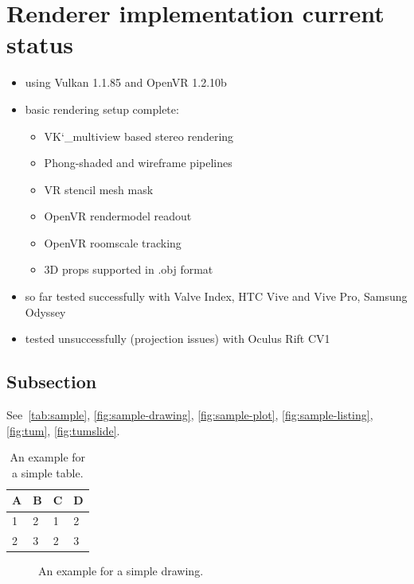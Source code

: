 \section{Renderer implementation current status}
\begin{itemize}
\item using Vulkan 1.1.85 and OpenVR 1.2.10b 
\item basic rendering setup complete: 
\begin{itemize}
\item VK\char`_multiview based stereo rendering 
\item Phong-shaded and wireframe pipelines 
\item VR stencil mesh mask 
\item OpenVR rendermodel readout 
\item OpenVR roomscale tracking 
\item 3D props supported in .obj format 
\end{itemize}
\item so far tested successfully with Valve Index, HTC Vive and Vive Pro, Samsung Odyssey 
\item tested unsuccessfully (projection issues) with Oculus Rift CV1 
\end{itemize}

\iffalse
\subsection{Subsection}

See~\autoref{tab:sample}, \autoref{fig:sample-drawing}, \autoref{fig:sample-plot}, \autoref{fig:sample-listing}, \autoref{fig:tum}, \autoref{fig:tumslide}.

\begin{table}[htpb]
  \caption[Example table]{An example for a simple table.}\label{tab:sample}
  \centering
  \begin{tabular}{l l l l}
    \toprule
      A & B & C & D \\
    \midrule
      1 & 2 & 1 & 2 \\
      2 & 3 & 2 & 3 \\
    \bottomrule
  \end{tabular}
\end{table}

\begin{figure}[htpb]
  \centering
  \caption[Example drawing]{An example for a simple drawing.}\label{fig:sample-drawing}
\end{figure}

